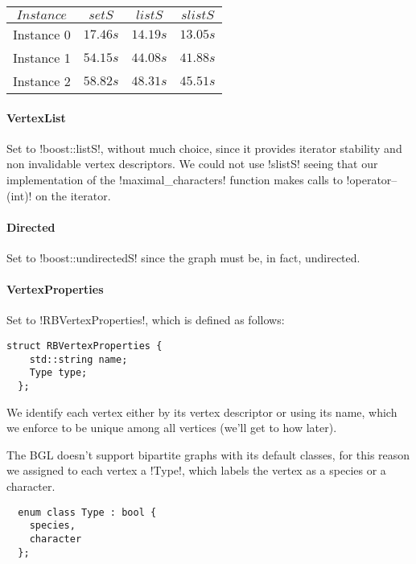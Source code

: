 \begin{center}
  \begin{tabular}{c | c c c}
    $Instance$ & $setS$   & $listS$  & $slistS$ \\
    \hline
    Instance 0 & $17.46s$ & $14.19s$ & $13.05s$ \\
    Instance 1 & $54.15s$ & $44.08s$ & $41.88s$ \\
    Instance 2 & $58.82s$ & $48.31s$ & $45.51s$
  \end{tabular}
\end{center}

\paragraph{VertexList}

Set to !boost::listS!, without much choice, since it provides iterator stability and non invalidable vertex descriptors.
We could not use !slistS! seeing that our implementation of the !maximal_characters! function makes calls to !operator--(int)! on the iterator.

\paragraph{Directed}

Set to !boost::undirectedS! since the graph must be, in fact, undirected.

\paragraph{VertexProperties}

Set to !RBVertexProperties!, which is defined as follows:

\begin{lstlisting}[moreemph={Type}]
  struct RBVertexProperties {
    std::string name;
    Type type;
  };
\end{lstlisting}

We identify each vertex either by its vertex descriptor or using its name, which we enforce to be unique among all vertices (we'll get to how later).

The BGL doesn't support bipartite graphs with its default classes, for this reason we assigned to each vertex a !Type!, which labels the vertex as a species or a character.

\begin{lstlisting}
  enum class Type : bool {
    species,
    character
  };
\end{lstlisting}

